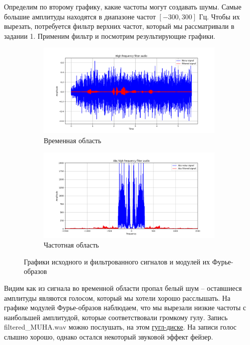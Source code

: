 \documentclass[a4paper, 12pt]{article}
\begin{document}
    
    Определим по второму графику, какие частоты могут создавать шумы.
    Самые большие амплитуды находятся в диапазоне частот $[-300,300]$ Гц. Чтобы их вырезать, потребуется фильтр верхних частот, который
    мы рассматривали в задании 1. Применим фильтр и посмотрим результирующие графики.
    \begin{figure}[H]
        \centering
        \begin{subfigure}{0.45\textwidth}
            \centering
            \includegraphics[width=\linewidth]{faudio.png}
            \caption{Временная область}
            \label{fig:fig113}
        \end{subfigure}
        \hspace{5mm}
        \begin{subfigure}{0.45\textwidth}
            \centering
            \includegraphics[width=\linewidth]{abs_audio.png}
            \caption{Частотная область}
            \label{fig:fig114}
        \end{subfigure}
        \caption{Графики исходного и фильтрованного сигналов и модулей их Фурье-образов}
        \label{fig:timefreq}
    \end{figure}

    
    Видим как из сигнала во временной области пропал белый шум -- оставшиеся амплитуды являются голосом, который 
    мы хотели хорошо расслышать.
    На графике модулей Фурье-образов наблюдаем, что мы вырезали
    низкие частоты с наибольшей амплитудой, которые соответствовали громкому гулу. Запись filtered\_{MUHA}.wav можно послушать,
    на этом \href{https://drive.google.com/drive/folders/1AuXIiKRWvXFOtJqV3uqPzC494zZ7vCrd?usp=sharing}{гугл-диске}.
    На записи голос слышно хорошо, однако остался некоторый звуковой эффект фейзер.
\end{document}
